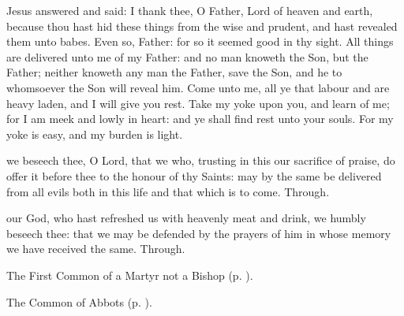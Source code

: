 
 Jesus answered and said: I thank thee, O Father, Lord of heaven and earth, because thou hast hid these things from the wise and prudent, and hast revealed them unto babes. Even so, Father: for so it seemed good in thy sight. All things are delivered unto me of my Father: and no man knoweth the Son, but the Father; neither knoweth any man the Father, save the Son, and he to whomsoever the Son will reveal him. Come unto me, all ye that labour and are heavy laden, and I will give you rest. Take my yoke upon you, and learn of me; for I am meek and lowly in heart: and ye shall find rest unto your souls. For my yoke is easy, and my burden is light.


\secret
{} we beseech thee, O Lord, that we who, trusting in this our sacrifice of praise, do offer it before thee to the honour of thy Saints: may by the same be delivered from all evils both in this life and that which is to come. Through.


\postcommunion
{} our God, who hast refreshed us with heavenly meat and drink, we humbly beseech thee: that we may be defended by the prayers of him in whose memory we have received the same. Through.



\begin{rubric}
	The First Common of a Martyr not a Bishop (p. \pageref{CommonMartyrNotBishopI}).
\end{rubric}


\clearpage
{}

\begin{rubric}
	The Common of Abbots (p. \pageref{CommonAbbots}).
\end{rubric}

